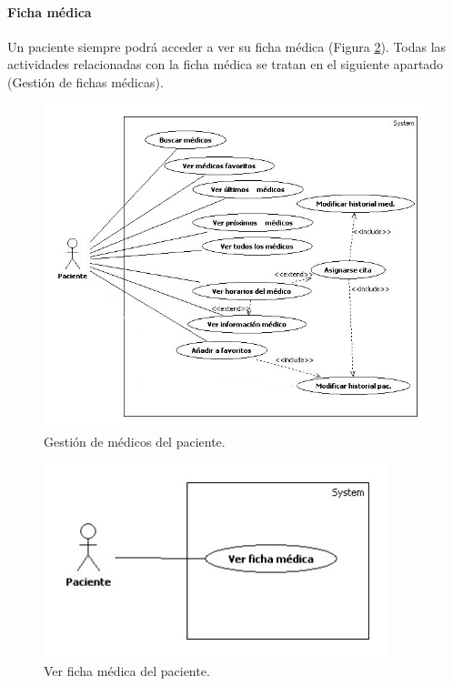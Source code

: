 			
			\paragraph{Ficha médica} %
			\label{par:ficha_medica}
				
				Un paciente siempre podrá acceder a ver su ficha médica (Figura \ref{fig:ficha_pac}). Todas las actividades relacionadas con la ficha médica se tratan en el siguiente apartado (Gestión de fichas médicas).
				\begin{figure}[H]
				  \centering
				    \includegraphics[width=14cm]{img/jpg/casos_uso/Gestion_medicos.jpg}
				  \caption{Gestión de médicos del paciente.}
				  \label{fig:med_pac}
				\end{figure}
				
				\begin{figure}[H]
				  \centering
				    \includegraphics[width=10cm]{img/jpg/casos_uso/Ver_ficha_medica.jpg}
				  \caption{Ver ficha médica del paciente.}
				  \label{fig:ficha_pac}
				\end{figure}
			
